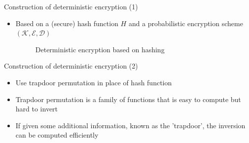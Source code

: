 \documentclass{beamer}
\begin{document}
\begin{frame}{Construction of deterministic encryption (1)}
\begin{itemize}
\item Based on a (secure) hash function $H$ and a probabilistic encryption scheme $(\mathcal{K}, \mathcal{E}, \mathcal{D})$

\begin{figure}[H]
	\begin{pchstack}[center]
		
		\pchspace
		
		
		\pchspace
		
	\end{pchstack}
	
	\caption{Deterministic encryption based on hashing}
\end{figure}

\end{itemize}
\end{frame}


\begin{frame}{Construction of deterministic encryption (2)}
\begin{itemize}
\item Use trapdoor permutation in place of hash function
\item Trapdoor permutation is a family of functions that is easy to compute but hard to invert
\item If given some additional information, known as the 'trapdoor', the inversion can be computed efficiently
\end{itemize}
\end{frame}
\end{document}
